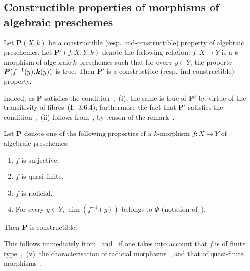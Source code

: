 \subsection{Constructible properties of morphisms of algebraic preschemes}
\label{subsection:IV.9.3}

\begin{proposition}[9.3.1]
\label{IV.9.3.1}
Let $\boldsymbol{P}(X,k)$ be a constructible \textnormal{(resp.}\ ind-constructible\textnormal{)} property of algebraic preschemes.
Let $\boldsymbol{P}'(f,X,Y,k)$ denote the following relation: $f:X\to Y$ is a $k$-morphism of algebraic $k$-preschemes such that for every $y\in Y$, the property $\boldsymbol{P}(f^{-1}(y),\boldsymbol{k}(y))$ is true.
Then $\boldsymbol{P}'$ is a constructible \textnormal{(resp.}\ ind-constructible\textnormal{)} property.
\end{proposition}

Indeed, as $\boldsymbol{P}$ satisfies the condition~,~(i), the same is true of $\boldsymbol{P}'$ by virtue of the transitivity of fibres~(\textbf{I},~3.6.4); furthermore the fact that $\boldsymbol{P}'$ satisfies the condition~,~(ii) follows from~, by reason of the remark~.

\begin{proposition}[9.3.2]
\label{IV.9.3.2}
Let $\boldsymbol{P}$ denote one of the following properties of a $k$-morphism $f:X\to Y$ of algebraic preschemes:
\begin{enumerate}[label=\textup{(\roman*)}]
  \item $f$ is surjective.
  \item $f$ is quasi-finite.
  \item $f$ is radicial.
  \item For every $y\in Y$, $\dim(f^{-1}(y))$ belongs to $\Phi$ \textnormal{(}notation of~\textnormal{)}.
\end{enumerate}
Then $\boldsymbol{P}$ is constructible.
\end{proposition}

This follows immediately from~ and~ if one takes into account that $f$ is of finite type~,~(v), the characterisation of radicial morphisms~, and that of quasi-finite morphisms~.

